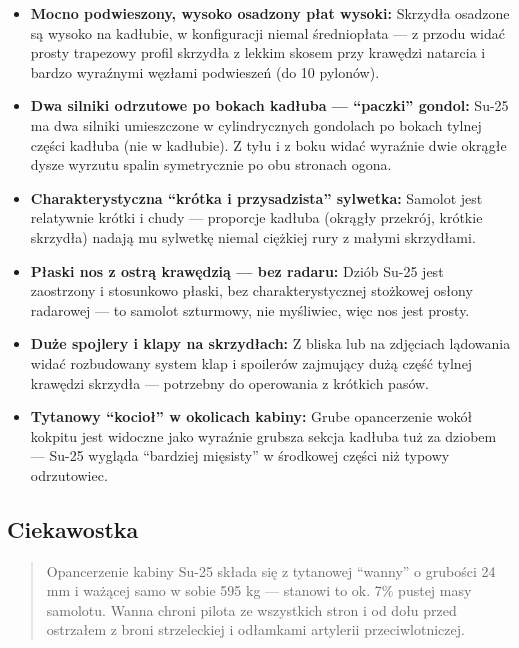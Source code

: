 \documentclass[12pt,oneside]{book}
\providecommand{\tightlist}{%
  \setlength{\itemsep}{0pt}\setlength{\parskip}{0pt}}
\begin{document}
\begin{itemize}
\tightlist
\item
  \textbf{Mocno podwieszony, wysoko osadzony płat wysoki:} Skrzydła
  osadzone są wysoko na kadłubie, w konfiguracji niemal średniopłata ---
  z przodu widać prosty trapezowy profil skrzydła z lekkim skosem przy
  krawędzi natarcia i bardzo wyraźnymi węzłami podwieszeń (do 10
  pylonów).
\item
  \textbf{Dwa silniki odrzutowe po bokach kadłuba --- ``paczki''
  gondol:} Su-25 ma dwa silniki umieszczone w cylindrycznych gondolach
  po bokach tylnej części kadłuba (nie w kadłubie). Z tyłu i z boku
  widać wyraźnie dwie okrągłe dysze wyrzutu spalin symetrycznie po obu
  stronach ogona.
\item
  \textbf{Charakterystyczna ``krótka i przysadzista'' sylwetka:} Samolot
  jest relatywnie krótki i chudy --- proporcje kadłuba (okrągły
  przekrój, krótkie skrzydła) nadają mu sylwetkę niemal ciężkiej rury z
  małymi skrzydłami.
\item
  \textbf{Płaski nos z ostrą krawędzią --- bez radaru:} Dziób Su-25 jest
  zaostrzony i stosunkowo płaski, bez charakterystycznej stożkowej
  osłony radarowej --- to samolot szturmowy, nie myśliwiec, więc nos
  jest prosty.
\item
  \textbf{Duże spojlery i klapy na skrzydłach:} Z bliska lub na
  zdjęciach lądowania widać rozbudowany system klap i spoilerów
  zajmujący dużą część tylnej krawędzi skrzydła --- potrzebny do
  operowania z krótkich pasów.
\item
  \textbf{Tytanowy ``kocioł'' w okolicach kabiny:} Grube opancerzenie
  wokół kokpitu jest widoczne jako wyraźnie grubsza sekcja kadłuba tuż
  za dziobem --- Su-25 wygląda ``bardziej mięsisty'' w środkowej części
  niż typowy odrzutowiec.
\end{itemize}

\subsection{Ciekawostka}\label{ciekawostka-57}

\begin{quote}
Opancerzenie kabiny Su-25 składa się z tytanowej ``wanny'' o grubości 24
mm i ważącej samo w sobie 595 kg --- stanowi to ok. 7\% pustej masy
samolotu. Wanna chroni pilota ze wszystkich stron i od dołu przed
ostrzałem z broni strzeleckiej i odłamkami artylerii przeciwlotniczej.
\end{quote}
\end{document}

